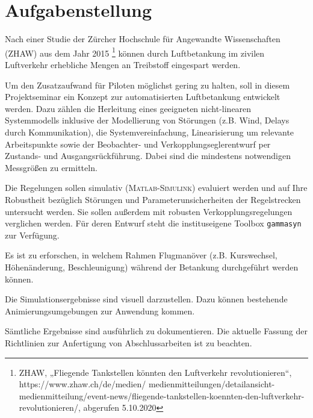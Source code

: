 \section*{Aufgabenstellung}

Nach einer Studie der Zürcher Hochschule für Angewandte Wissenschaften (ZHAW) aus dem Jahr 2015 \footnote{ZHAW, „Fliegende Tankstellen könnten den Luftverkehr revolutionieren“, https://www.zhaw.ch/de/medien/
	medienmitteilungen/detailansicht-medienmitteilung/event-news/fliegende-tankstellen-koennten-den-luftverkehr-revolutionieren/, abgerufen 5.10.2020} können durch Luftbetankung im zivilen Luftverkehr erhebliche Mengen an Treibstoff eingespart werden.

Um den Zusatzaufwand für Piloten möglichst gering zu halten, soll in diesem Projektseminar ein Konzept zur automatisierten Luftbetankung entwickelt werden. Dazu zählen die Herleitung eines geeigneten nicht-linearen Systemmodells inklusive der Modellierung von Störungen (z.B. Wind, Delays durch Kommunikation), die Systemvereinfachung, Linearisierung um relevante Arbeitspunkte sowie der Beobachter- und Verkopplungseglerentwurf per Zustands- und Ausgangsrückführung. Dabei sind die mindestens notwendigen Messgrößen zu ermitteln.

Die Regelungen sollen simulativ (\textsc{Matlab-Simulink}) evaluiert werden und auf Ihre Robustheit bezüglich Störungen und Parameterunsicherheiten der Regelstrecken untersucht werden. Sie sollen außerdem mit robusten Verkopplungsregelungen verglichen werden. Für deren Entwurf steht die instituseigene Toolbox \texttt{gammasyn} zur Verfügung.

Es ist zu erforschen, in welchem Rahmen Flugmanöver (z.B. Kurswechsel, Höhenänderung, Beschleunigung) während der Betankung durchgeführt werden können.

Die Simulationsergebnisse sind visuell darzustellen. Dazu können bestehende Animierungsumgebungen zur Anwendung kommen.

Sämtliche Ergebnisse sind ausführlich zu dokumentieren. Die aktuelle Fassung der Richtlinien zur Anfertigung von Abschlussarbeiten ist zu beachten.


\SADAAufgabenstellung